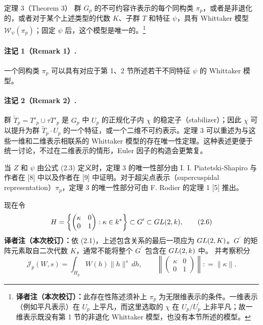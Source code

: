 \begin{originaltheorem}{定理 3（Theorem 3）}
群 $G_p$ 的不可约容许表示的每个同构类 $\pi_p$，或者是非退化的，或者对于某个上述类型的代数 $K$、子群 $T$ 和特征 $\psi$，具有 Whittaker 模型 $\mathcal W_\psi(\pi_p)$；固定 $\psi$ 后，这个模型是唯一的。\footnote{\textbf{译者注（本次校订）：}此存在性陈述须补上 $\pi_p$ 为无限维表示的条件。一维表示（例如平凡表示）在 $U_p$ 上平凡，而这里选取的 $\chi$ 在 $U_p/U_p^{\prime}$ 上非平凡；故一维表示既没有第 1 节的非退化 Whittaker 模型，也没有本节所述的模型。}
\end{originaltheorem}

\paragraph*{注记 1（Remark 1）.}
一个同构类 $\pi_p$ 可以具有对应于第 1、2 节所述若干不同特征 $\psi$ 的 Whittaker 模型。

\paragraph*{注记 2（Remark 2）.}
群 $\widetilde T_p=T'_p\cup\tau T'_p$ 是 $G_p$ 中 $U_p$ 的正规化子内 $\chi$ 的稳定子（stabilizer）；因此 $\chi$ 可以提升为群 $\widetilde T_p\cdot U_p$ 的一个特征，或一个二维不可约表示。定理 3 可以重述为与这些一维和二维表示相联系的 Whittaker 模型的存在唯一性定理。这种表述更便于统一讨论，不过在二维表示的情形，Euler 因子的构造会更繁复。

当 $Z$ 和 $\psi$ 由公式 (2.3) 定义时，定理 3 的唯一性部分由 I. I. Piatetski-Shapiro 与作者在 [8] 中以及作者在 [9] 中证明。对于超尖点表示（supercuspidal representation）$\pi_p$，定理 3 的唯一性部分可由 F. Rodier 的定理 1 [5] 推出。

现在令
\begin{equation}
 H=\left\{\begin{pmatrix}\kappa&0\\0&1\end{pmatrix}:\kappa\in k^*\right\}
 \subset G'\subset GL(2,k),
 \tag{2.6}
\end{equation}
\noindent\footnotesize\textbf{译者注（本次校订）：}依 (2.1)，上述包含关系的最后一项应为 $GL(2,K)$。$G^{\prime}$ 的矩阵元素取自二次代数 $K$，通常不能将整个 $G^{\prime}$ 包含在 $GL(2,k)$ 中。\normalsize
并考察积分
\begin{equation}
 \mathcal J_p(W,s)=\int_{H_p}W(h)\|h\|^s\,dh,
 \qquad\left\|\begin{pmatrix}\kappa&0\\0&1\end{pmatrix}\right\|
 \mathrel{\mathop:}=\|\kappa\|.
 \tag{2.7}
\end{equation}

